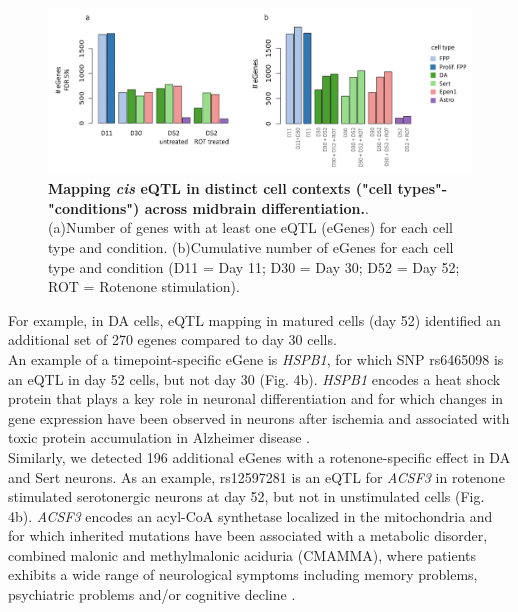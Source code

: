 \begin{figure}[h]
\centering
\includegraphics[width=16cm]{Chapter5/Fig/neuroseq_eqtl.png}
\caption[Mapping eQTL across neuronal cell types]{\textbf{Mapping \textit{cis} eQTL in distinct cell contexts ("cell types"-"conditions") across midbrain differentiation.}.\\
(a)Number of genes with at least one eQTL (eGenes) for each cell type and condition.
(b)Cumulative number of eGenes for each cell type and condition (D11 = Day 11; D30 = Day 30; D52 = Day 52; ROT = Rotenone stimulation).}
\label{fig:neuroseq_eqtl}
\end{figure}

For example, in DA cells, eQTL mapping in matured cells (day 52) identified an additional set of 270 egenes compared to day 30 cells.\\

An example of a timepoint-specific eGene is \textit{HSPB1}, for which SNP rs6465098 is an eQTL in day 52 cells, but not day 30 (Fig. 4b). 
\textit{HSPB1} encodes a heat shock protein that plays a key role in neuronal differentiation \cite{miller2018heat} and for which changes in gene expression have been observed in neurons after ischemia \cite{bartelt2016hspb5} and associated with toxic protein accumulation in Alzheimer disease \cite{shimura2004binding, wilhelmus2006small}.\\

Similarly, we detected 196 additional eGenes with a rotenone-specific effect in DA and Sert neurons. 
As an example, rs12597281 is an eQTL for \textit{ACSF3} in rotenone stimulated serotonergic neurons at day 52, but not in unstimulated cells (Fig. 4b). 
\textit{ACSF3} encodes an acyl-CoA synthetase localized in the mitochondria and for which inherited mutations have been associated with a metabolic disorder, combined malonic and methylmalonic aciduria (CMAMMA), where patients exhibits a wide range of neurological symptoms including memory problems, psychiatric problems and/or cognitive decline \cite{tucci2020brain}.\\


